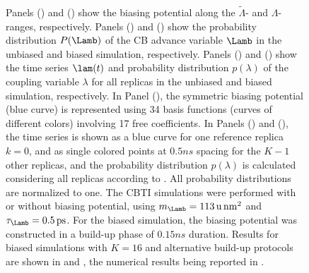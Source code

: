 \begin{figure}
  \centering
  \\[-1.2em]%
  \\[-1.2em]
  \\[-1.2em]
  \caption{\footnotesize
%
%
%
             Panels () and () show the biasing potential
             along the $\tilde{\Lambda}$- and $\Lambda$-ranges, respectively.
%
             Panels () and () show the
             probability distribution $P(\Lamb)$ of the CB advance variable $\Lamb$
             in the unbiased and biased simulation, respectively.
%
             Panels () and () show
             the time series $\lam(t)$ and probability distribution $p(\lambda)$
             of the coupling variable $\lambda$ for all replicas
             in the unbiased and biased simulation, respectively.
%
             In Panel (), the symmetric biasing potential (blue curve) is represented
             using 34 basis functions (curves of different colors) involving 17 free coefficients.
%
             In Panels () and (), the time series is shown as a blue curve for one reference 
             replica $k=0$, and as single colored points at $0.5\unit{ns}$ spacing 
             for the $K-1$ other replicas, and the probability distribution 
             $p(\lambda)$ is calculated considering all replicas according to .
%
            All probability distributions are normalized to one. 
%
            The CBTI simulations were performed with or without biasing potential,
            using $m_{\Lamb}=113\,\mathrm{u}\,\mathrm{nm}^2$ and $\tau_{\Lamb}=0.5\,\mathrm{ps}$.
%
            For the biased simulation, the biasing potential was constructed in a build-up phase
            of $0.15\unit{ns}$ duration.
%
            Results for biased simulations with $K=16$ and alternative build-up protocols are shown
            in  and , the numerical results being
            reported in .
      }
\label{fig:leus}
\end{figure}




